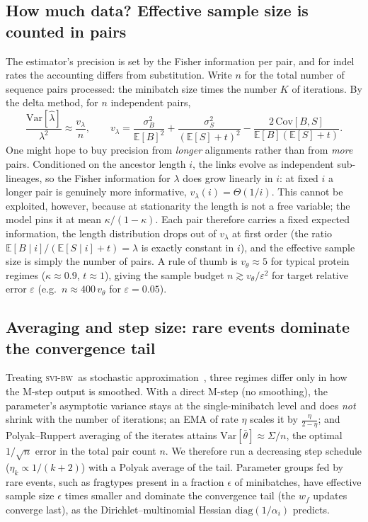 \documentclass{article}
\newcommand{\E}{\mathbb{E}}
\newcommand{\ins}{\lambda}
\newcommand{\svibw}{\textsc{svi-bw}}
\begin{document}
\subsection{How much data? Effective sample size is counted in pairs}
The estimator's precision is set by the Fisher information per pair,
and for indel rates the accounting differs from substitution.
Write $n$ for the total number of sequence pairs processed: the
minibatch size times the number $K$ of iterations. By the delta method,
for $n$ independent pairs,
\begin{equation}
\label{eq:relvar}
\frac{\mathrm{Var}[\hat\ins]}{\ins^2}\approx\frac{v_\ins}{n},\qquad
v_\ins=\frac{\sigma_B^2}{\E[B]^2}+\frac{\sigma_S^2}{(\E[S]+t)^2}
        -\frac{2\,\mathrm{Cov}[B,S]}{\E[B](\E[S]+t)} .
\end{equation}
One might hope to buy precision from \emph{longer} alignments rather than
from \emph{more} pairs. Conditioned on the ancestor length $i$, the links
evolve as independent sub-lineages, so the Fisher information for $\ins$
does grow linearly in $i$: at fixed $i$ a longer pair is genuinely more
informative, $v_\ins(i)=\Theta(1/i)$. This cannot be exploited, however,
because at stationarity the length is not a free variable; the model pins
it at mean $\kappa/(1{-}\kappa)$. Each pair therefore carries a fixed
expected information, the length distribution drops out of $v_\ins$ at
first order (the ratio $\E[B\mid i]/(\E[S\mid i]{+}t)=\ins$ is exactly
constant in $i$), and the effective sample size is simply the number of
pairs. A
rule of thumb is $v_\theta\approx 5$ for typical protein regimes
($\kappa\approx0.9$, $t\approx1$), giving the sample budget
$n\gtrsim v_\theta/\varepsilon^2$ for target relative error
$\varepsilon$ (e.g.\ $n\approx400\,v_\theta$ for $\varepsilon{=}0.05$).

\subsection{Averaging and step size: rare events dominate the convergence tail}
\label{sub:averaging}

Treating \svibw\ as stochastic approximation~\cite{cappemoulines2009},
three regimes differ only in how the M-step output is smoothed. With a
direct M-step (no smoothing), the parameter's asymptotic variance stays
at the single-minibatch level and does \emph{not} shrink with the number
of iterations; an EMA of rate $\eta$ scales it by $\tfrac{\eta}{2-\eta}$;
and Polyak--Ruppert averaging of the iterates attains
$\mathrm{Var}[\bar\theta]\approx\Sigma/n$, the optimal $1/\sqrt{n}$ error
in the total pair count $n$. We therefore run a decreasing
step schedule ($\eta_k\propto 1/(k{+}2)$) with a Polyak average of the
tail. Parameter groups fed by rare events, such as fragtypes present in
a fraction $\epsilon$ of minibatches, have effective sample size
$\epsilon$ times smaller and dominate the convergence tail (the $w_f$
updates converge last), as the Dirichlet--multinomial Hessian
$\mathrm{diag}(1/\alpha_i)$ predicts.
\end{document}
